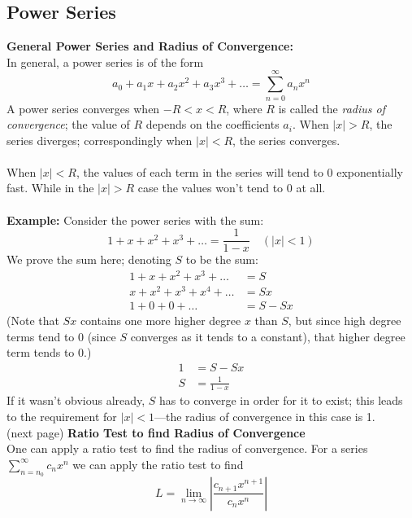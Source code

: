 \documentclass{report}
\begin{document}
\subsection{Power Series} %
\textbf{General Power Series and Radius of Convergence:}\\
In general, a power series is of the form 
\begin{equation*}
a_0+a_1x+a_2x^2+a_3x^3+\ldots=\sum^\infty_{n=0}a_nx^n
\end{equation*}
A power series converges when $-R<x<R$, where $R$ is called the \textit{radius of convergence}; the value of $R$ depends on the coefficients $a_i$. 
When $|x|>R$, the series diverges; correspondingly when $|x|<R$, the series converges.\\
\vspace{1mm}\\
When $|x|<R$, the values of each term in the series will tend to 0 exponentially fast. While in the $|x|>R$ case the values won't tend to 0 at all.\\
\vspace{1mm}\\
\textbf{Example:} 
Consider the power series with the sum:
\begin{equation*}
1+x+x^2+x^3+\ldots=\frac{1}{1-x}\quad(|x|<1)
\end{equation*}
We prove the sum here; denoting $S$ to be the sum:
\begin{align*}
1+x+x^2+x^3+\ldots&=S\\
x+x^2+x^3+x^4+\ldots&=Sx\\
1+0+0+\ldots&=S-Sx
\end{align*}
(Note that $Sx$ contains one more higher degree $x$ than $S$, but since high degree terms tend to 0 (since $S$ converges as it tends to a constant), 
that higher degree term tends to 0.)
\begin{align*}
1&=S-Sx\\
S&=\frac{1}{1-x}
\end{align*}
If it wasn't obvious already, $S$ has to converge in order for it to exist; this leads to the requirement for $|x|<1$---the radius
of convergence in this case is 1.\\
(next page)
\newpage
\noindent\textbf{Ratio Test to find Radius of Convergence}\\
One can apply a ratio test to find the radius of convergence. For a series
$\sum_{n=n_0}^\infty c_nx^n$ we can apply the ratio test to find
\begin{equation*}
L=\lim_{n\to\infty}\left|\frac{c_{n+1}x^{n+1}}{c_{n}x^{n}}\right|
\end{equation*}
\end{document}
